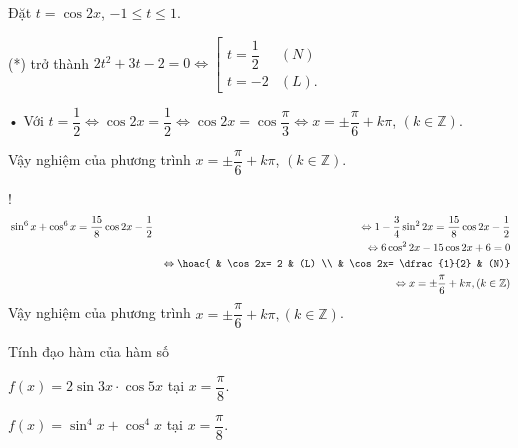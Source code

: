 \begin{bt}
{\begin{listEX}[2]
			Đặt $t = \cos 2x$, $- 1 \le t \le 1$.
			
			(*) trở thành $ 2t^2 + 3t - 2 = 0 \Leftrightarrow 
			\left[\begin{array}{lr}
				t = \dfrac{1}{2}& (N)\\
				t =  - 2& (L).
			\end{array} \right.$
			
			• Với $t=\dfrac{1}{2}\Leftrightarrow 
			\cos 2x=\dfrac{1}{2}\Leftrightarrow 
			\cos 2x=\cos \dfrac{\pi}{3}\Leftrightarrow 
			x=\pm \dfrac{\pi}{6}+k\pi $, $( k\in \mathbb{Z})$.
			
			Vậy nghiệm của phương trình $x=\pm \dfrac{\pi}{6}+k\pi$, $( k\in \mathbb{Z})$.
			\item! 
			\begin{eqnarray*}
				&\sin^6x + \cos^6x = \dfrac{15}{8} \cos 2x - \dfrac{1}{2}
				&\Leftrightarrow 1-\dfrac{3}{4}\sin^22x= \dfrac{15}{8} \cos 2x - \dfrac{1}{2}\\
				&&\Leftrightarrow 6\cos^2 2x-15\cos 2x+6=0\\
				&&\Leftrightarrow 
				\hoac{ & \cos 2x= 2 & (L) \\ & \cos 2x= \dfrac{1}{2} & (N)}\\
				&&\Leftrightarrow x=\pm \dfrac{\pi}{6}+k\pi, (k\in \mathbb{Z})
			\end{eqnarray*}
			Vậy nghiệm của phương trình  
			$  x=\pm \dfrac{\pi}{6}+k\pi, (k\in \mathbb{Z})$. 
		\end{listEX}
	}
\end{bt}

\begin{bt}%
Tính đạo hàm của hàm số
\begin{listEX}[1]
\item $f(x)=2\sin 3x\cdot\cos 5x$ tại $x=\dfrac{\pi}{8}$.
\item $f(x)=\sin^4x+\cos^4x$ tại $x=\dfrac{\pi}{8}$.
\end{listEX}
\end{bt}


